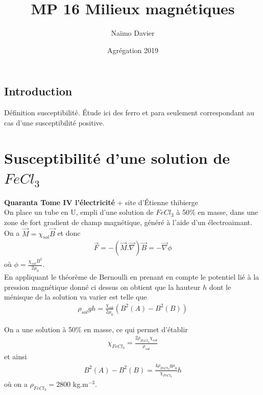 \documentclass[12pt,prb,aps,epsf]{article}
\begin{document}
	
	\title{MP 16 Milieux magnétiques}
		\author{Naïmo Davier}
		\date{Agrégation 2019}
		
	\maketitle
	
	\tableofcontents
	
	\pagebreak
	
\subsection{Introduction}
Définition susceptibilité. Étude ici des ferro et para seulement correspondant au cas d'une susceptibilité positive.	
\section{Susceptibilité d'une solution de $FeCl_3$}	
\textbf{Quaranta Tome IV l'électricité} + site d'Étienne thibierge\\
	
On place un tube en U, empli d'une solution de $FeCl_3$ à 50\% en masse, dans une zone de fort gradient de champ magnétique, généré à l'aide d'un électroaimant.\\

On a $\vec{M} = \chi_{sol}\vec{B}$ et donc 
\begin{eqnarray}
\vec{F} = -(\vec{M}.\vec{\nabla})\vec{B} = -\vec{\nabla}\phi 
\end{eqnarray}
où $\phi = \frac{\chi_{sol}B^2}{2\mu_0}$.\\

En appliquant le théorème de Bernoulli en prenant en compte le potentiel lié à la pression magnétique donné ci dessus on obtient que la hauteur $h$ dont le ménisque de la solution va varier est telle que 
\begin{eqnarray}
\rho_{sol}gh = \frac{\chi_{sol} }{2\mu_0} (B^2(A)-B^2(B))
\end{eqnarray}

On a une solution à 50\% en masse, ce qui permet d'établir 
\begin{eqnarray}
\chi_{FeCl_3} = \frac{2\rho_{FeCl_3}\chi_{sol}}{\rho_{sol}}
\end{eqnarray}
et ainsi 
\begin{eqnarray}
B^2(A)- B^2(B) = \frac{4\rho_{FeCl_3}g\mu_0}{\chi_{FeCl_3}}h
\end{eqnarray}
où on a $\rho_{FeCl_3} = 2800$ kg.m$^{-3}$.\\
\end{document}
